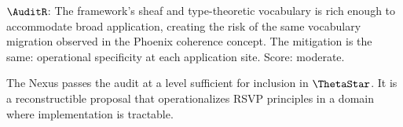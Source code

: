 $\AuditR$: The framework's sheaf and type-theoretic
vocabulary is rich enough to accommodate broad
application, creating the risk of the same vocabulary
migration observed in the Phoenix coherence concept.
The mitigation is the same: operational specificity
at each application site. Score: moderate.

The Nexus passes the audit at a level sufficient for
inclusion in $\ThetaStar$. It is a reconstructible
proposal that operationalizes RSVP principles in a
domain where implementation is tractable.
